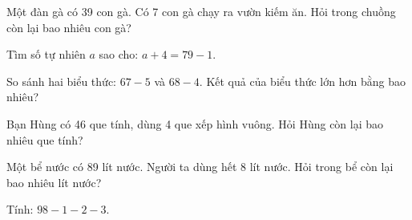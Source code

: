 \begin{ex}
Một đàn gà có 39 con gà. Có 7 con gà chạy ra vườn kiếm ăn. Hỏi trong chuồng còn lại bao nhiêu con gà?
\end{ex}

\begin{ex}
Tìm số tự nhiên $a$ sao cho: $a + 4 = 79 - 1$.
\end{ex}

\begin{ex}
So sánh hai biểu thức: $67 - 5$ và $68 - 4$. Kết quả của biểu thức lớn hơn bằng bao nhiêu?
\end{ex}

\begin{ex}
Bạn Hùng có 46 que tính, dùng 4 que xếp hình vuông. Hỏi Hùng còn lại bao nhiêu que tính?
\end{ex}

\begin{ex}
Một bể nước có 89 lít nước. Người ta dùng hết 8 lít nước. Hỏi trong bể còn lại bao nhiêu lít nước?
\end{ex}

\begin{ex}
Tính: $98 - 1 - 2 - 3$.
\end{ex}
